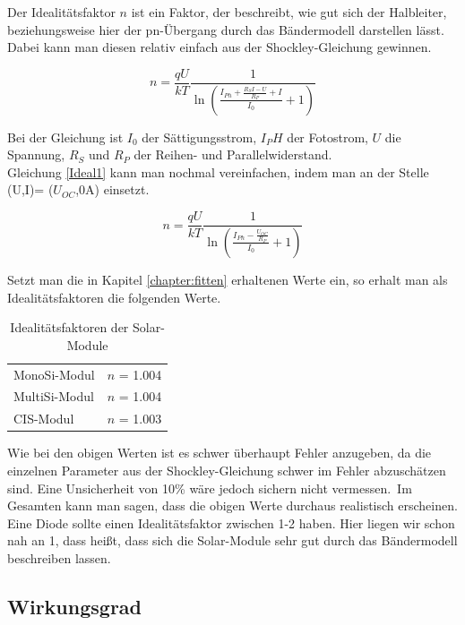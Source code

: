 Der Idealitätsfaktor $n$ ist ein Faktor, der beschreibt, wie gut sich der Halbleiter, beziehungsweise hier der pn-Übergang durch das Bändermodell 
darstellen lässt. Dabei kann man diesen relativ einfach aus der Shockley-Gleichung gewinnen.

\begin{equation}
    n =  \frac{qU}{kT} \frac{1}{\ln{(\frac{I_{Ph}+\frac{R_S I -U}{R_P}+I}{I_0}+1)}}
    \label{Ideal1}
\end{equation}

Bei der Gleichung ist $I_0$ der Sättigungsstrom, $I_PH$ der Fotostrom, $U$ die Spannung, $R_{S}$ und $R_{P}$ der Reihen- und Parallelwiderstand.\\
Gleichung \ref{Ideal1} kann man nochmal vereinfachen, indem man an der Stelle (U,I)= ($U_{OC}$,0A) einsetzt.

\begin{equation}
    n =  \frac{qU}{kT} \frac{1}{\ln{(\frac{I_{Ph}-\frac{U_{OC}}{R_P}}{I_0}+1)}}
    \label{Ideal2}
\end{equation}

Setzt man die in Kapitel \ref{chapter:fitten} erhaltenen Werte ein, so erhalt man als Idealitätsfaktoren die folgenden Werte.

\begin{table}[h]
    \centering
    \begin{tabular}{l|r}
        MonoSi-Modul & $n$ = 1.004\\
        MultiSi-Modul & $n$ = 1.004\\
        CIS-Modul & $n$ = 1.003\\
    \end{tabular}
    \caption{Idealitätsfaktoren der Solar-Module }
\end{table}

Wie bei den obigen Werten ist es schwer überhaupt Fehler anzugeben, da die einzelnen Parameter aus der Shockley-Gleichung 
schwer im Fehler abzuschätzen sind. Eine Unsicherheit von 10\% wäre jedoch sichern nicht vermessen.\
Im Gesamten kann man sagen, dass die obigen Werte durchaus realistisch erscheinen. Eine 
Diode sollte einen Idealitätsfaktor zwischen 1-2 haben. Hier liegen wir schon nah an 1, dass 
heißt, dass sich die Solar-Module sehr gut durch das Bändermodell beschreiben lassen.


\subsection{Wirkungsgrad}

